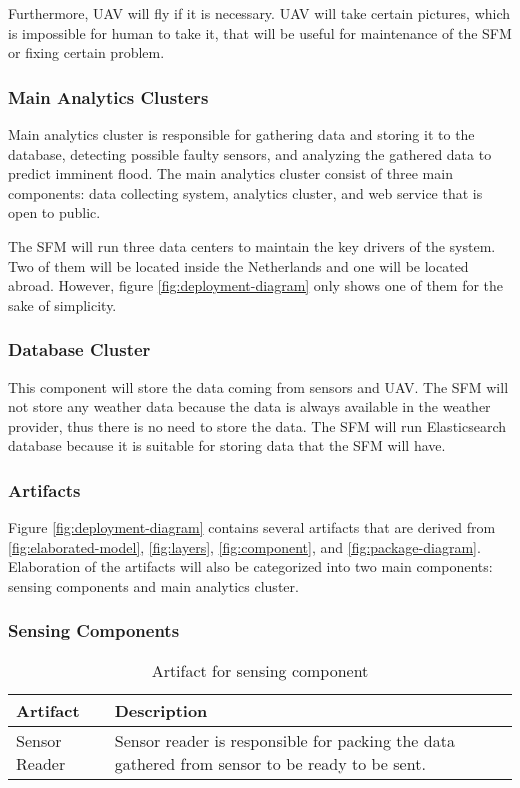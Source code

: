 Furthermore, \gls{UAV} will fly if it is necessary. \gls{UAV} will take certain pictures, which is impossible for human to take it, that will be useful for maintenance of the \gls{SFM} or fixing certain problem.

\subsubsection*{Main Analytics Clusters}
Main analytics cluster is responsible for gathering data and storing it to the database, detecting possible faulty sensors, and analyzing the gathered data to predict imminent flood. The main analytics cluster consist of three main components: data collecting system, analytics cluster, and web service that is open to public.

The \gls{SFM} will run three data centers to maintain the key drivers of the system. Two of them will be located inside the Netherlands and one will be located abroad. However, figure \ref{fig:deployment-diagram} only shows one of them for the sake of simplicity.

\subsubsection*{Database Cluster}
This component will store the data coming from sensors and \gls{UAV}. The \gls{SFM} will not store any weather data because the data is always available in the weather provider, thus there is no need to store the data. The \gls{SFM} will run Elasticsearch database because it is suitable for storing data that the \gls{SFM} will have.

\subsubsection{Artifacts}
Figure \ref{fig:deployment-diagram} contains several artifacts that are derived from \autoref{fig:elaborated-model}, \autoref{fig:layers}, \autoref{fig:component}, and \autoref{fig:package-diagram}. Elaboration of the artifacts will also be categorized into two main components: sensing components and main analytics cluster.

\subsubsection*{Sensing Components}
\begin{table}[H]
	\begin{tabular}{L{0.2\textwidth} L{0.6\textwidth}}
		\textbf{Artifact} & \textbf{Description}                                                                           \\ \toprule
		Sensor Reader     & Sensor reader is responsible for packing the data gathered from sensor to be ready to be sent. \\ \bottomrule
	\end{tabular}
	\caption{Artifact for sensing component}
	\label{table:sensing-artifacts}
\end{table}

